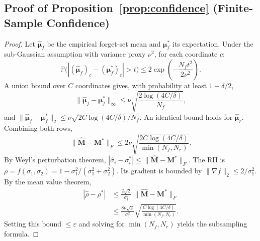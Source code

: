 \documentclass[journal]{IEEEtran}
\theoremstyle{definition}
\begin{document}
\subsection{Proof of Proposition~\ref{prop:confidence} (Finite-Sample Confidence)}
\begin{proof}
Let $\hat{\boldsymbol{\mu}}_f$ be the empirical forget-set mean and $\boldsymbol{\mu}_f^*$ its expectation. Under the sub-Gaussian assumption with variance proxy $\nu^2$, for each coordinate $c$:
\begin{equation}
\mathbb{P}\bigl(|(\hat{\boldsymbol{\mu}}_f)_c - (\boldsymbol{\mu}_f^*)_c| > t\bigr) \le 2\exp\!\left(-\frac{N_f t^2}{2\nu^2}\right).
\end{equation}
A union bound over $C$ coordinates gives, with probability at least $1-\delta/2$,
\begin{equation}
\|\hat{\boldsymbol{\mu}}_f - \boldsymbol{\mu}_f^*\|_\infty \le \nu\sqrt{\frac{2\log(4C/\delta)}{N_f}},
\end{equation}
and $\|\hat{\boldsymbol{\mu}}_f - \boldsymbol{\mu}_f^*\|_2 \le \nu\sqrt{2C\log(4C/\delta)/N_f}$. An identical bound holds for $\hat{\boldsymbol{\mu}}_r$. Combining both rows,
\begin{equation}
\|\hat{\mathbf{M}} - \mathbf{M}^*\|_F \le 2\nu\sqrt{\frac{2C\log(4C/\delta)}{\min(N_f,N_r)}}.
\end{equation}
By Weyl's perturbation theorem, $|\hat{\sigma}_i - \sigma_i^*| \le \|\hat{\mathbf{M}} - \mathbf{M}^*\|_F$. The RII is $\rho = f(\sigma_1,\sigma_2) = 1 - \sigma_1^2/(\sigma_1^2+\sigma_2^2)$. Its gradient is bounded by $\|\nabla f\|_2 \le 2/\sigma_1^2$. By the mean value theorem,
\begin{align}
|\hat{\rho} - \rho^*|
&\le \frac{2\sqrt{2}}{\sigma_1^2}\,\|\hat{\mathbf{M}}-\mathbf{M}^*\|_F \nonumber\\
&\le \frac{8\nu\sqrt{2}}{\sigma_1^2}\sqrt{\frac{C\log(4C/\delta)}{\min(N_f,N_r)}}.
\end{align}
Setting this bound $\le\varepsilon$ and solving for $\min(N_f,N_r)$ yields the subsampling formula.
\end{proof}
\end{document}
